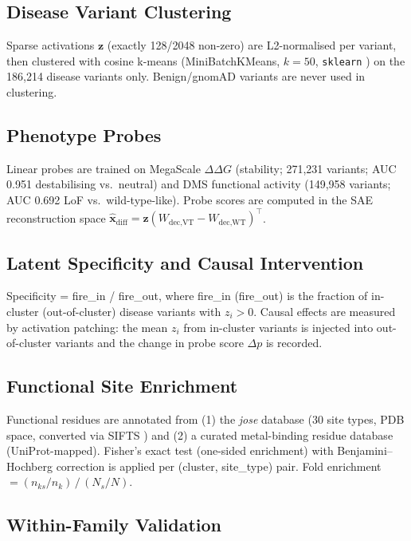 \documentclass[10pt]{article}
\begin{document}
\subsection{Disease Variant Clustering}

Sparse activations $\mathbf{z}$ (exactly 128/2048 non-zero) are L2-normalised per variant,
then clustered with cosine k-means (MiniBatchKMeans, $k = 50$, \texttt{sklearn}
\citep{pedregosa2011sklearn}) on the 186,214 disease variants only. Benign/gnomAD variants
are never used in clustering.

\subsection{Phenotype Probes}

Linear probes are trained on MegaScale $\Delta\Delta G$ (stability; 271,231 variants;
AUC 0.951 destabilising vs.\ neutral) and DMS functional activity (149,958 variants;
AUC 0.692 LoF vs.\ wild-type-like). Probe scores are computed in the SAE reconstruction
space $\hat{\mathbf{x}}_\text{diff} = \mathbf{z}(W_\text{dec,VT} - W_\text{dec,WT})^\top$.

\subsection{Latent Specificity and Causal Intervention}

Specificity = fire\_in / fire\_out, where fire\_in (fire\_out) is the fraction of in-cluster
(out-of-cluster) disease variants with $z_i > 0$. Causal effects are measured by activation
patching: the mean $z_i$ from in-cluster variants is injected into out-of-cluster variants
and the change in probe score $\Delta p$ is recorded.

\subsection{Functional Site Enrichment}

Functional residues are annotated from (1) the \emph{jose} database (30 site types, PDB
space, converted via SIFTS \citep{dana2019sifts}) and (2) a curated metal-binding residue
database (UniProt-mapped). Fisher's exact test (one-sided enrichment) with
Benjamini--Hochberg correction is applied per (cluster, site\_type) pair. Fold enrichment
$= (n_{ks}/n_k)\,/\,(N_s/N)$.

\subsection{Within-Family Validation}
\end{document}
